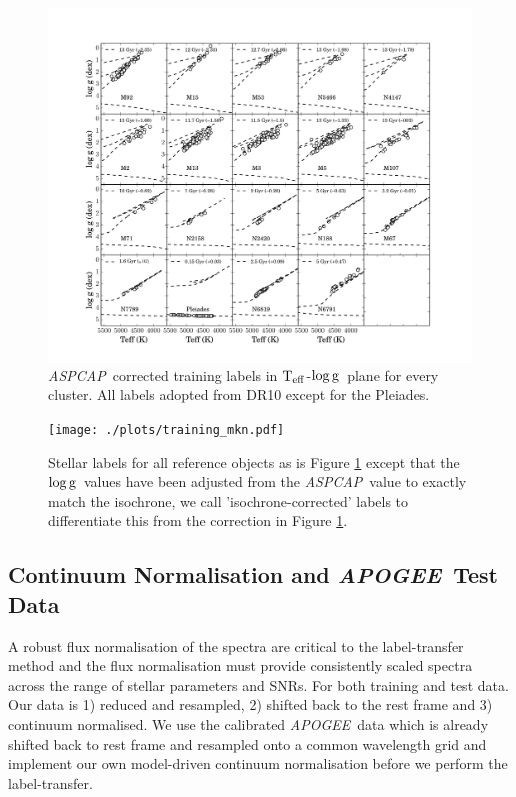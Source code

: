 \documentclass[12pt, preprint]{aastex}
\newcommand{\teff}{\mbox{$\rm T_{eff}$}}
\newcommand{\logg}{\mbox{$\rm \log g$}}
\newcommand{\apogee}{\textsl{APOGEE}}
\newcommand{\aspcap}{\textsl{ASPCAP}}
\begin{document}
\begin{figure}[h!]
\centering
    \includegraphics[scale=0.33]{./plots/training_aspcap.pdf}
\caption{\aspcap\ corrected training labels in \teff-\logg\ plane for every cluster. All labels adopted from DR10 except for the Pleiades. }
\label{fig:trainingaspcap}
\end{figure}

\begin{figure}[h!]
\centering
  \texttt{[image: ./plots/training\_mkn.pdf]}
\caption{Stellar labels for all reference objects as is Figure \ref{fig:trainingaspcap} except that the \logg\ values have been adjusted from the \aspcap\ value to exactly match the isochrone, we call  'isochrone-corrected' labels to differentiate this from the correction in Figure \ref{fig:trainingaspcap}.  }
\label{fig:trainingisochrone}
\end{figure}


\subsection{Continuum Normalisation and \apogee\ Test Data}

A robust flux normalisation of the spectra are critical to the label-transfer method and the flux normalisation must provide consistently scaled spectra across the range of stellar parameters and SNRs. For both training and test data. Our data is 1) reduced and resampled, 2) shifted back to the rest frame and 3) continuum normalised.  We use the calibrated \apogee\ data which is already shifted back to rest frame and resampled onto a common wavelength grid and implement our own model-driven continuum normalisation before we perform the label-transfer. 
\end{document}
